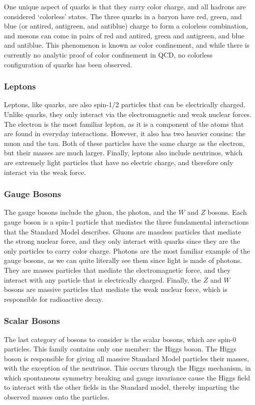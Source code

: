 One unique aspect of quarks is that they carry color charge, and all hadrons are considered `colorless' states.
The three quarks in a baryon have red, green, and blue (or antired, antigreen, and antiblue) charge to form a colorless combination, and mesons can come in pairs of red and antired, green and antigreen, and blue and antiblue.
This phenomenon is known as color confinement, and while there is currently no analytic proof of color confinement in QCD, no colorless configuration of quarks has been observed. %

\subsubsection{Leptons}
Leptons, like quarks, are also spin-1/2 particles that can be electrically charged. Unlike quarks, they only interact via the electromagnetic and weak nuclear forces.
The electron is the most familiar lepton, as it is a component of the atoms that are found in everyday interactions.
However, it also has two heavier cousins: the muon and the tau.
Both of these particles have the same charge as the electron, but their masses are much larger.
Finally, leptons also include neutrinos, which are extremely light particles that have no electric charge, and therefore only interact via the weak force.

\subsubsection{Gauge Bosons}
The gauge bosons include the gluon, the photon, and the $W$ and $Z$ bosons.
Each gauge boson is a spin-1 particle that mediates the three fundamental interactions that the Standard Model describes.
Gluons are massless particles that mediate the strong nuclear force, and they only interact with quarks since they are the only particles to carry color charge.
Photons are the most familiar example of the gauge bosons, as we can quite literally see them since light is made of photons.
They are masses particles that mediate the electromagnetic force, and they interact with any particle that is electrically charged.
Finally, the $Z$ and $W$ bosons are massive particles that mediate the weak nuclear force, which is responsible for radioactive decay.

\subsubsection{Scalar Bosons}
The last category of bosons to consider is the scalar bosons, which are spin-0 particles.
This family contains only one member: the Higgs boson.
The Higgs boson is responsible for giving all massive Standard Model particles their masses, with the exception of the neutrinos.
This occurs through the Higgs mechanism, in which spontaneous symmetry breaking and gauge invariance cause the Higgs field to interact with the other fields in the Standard model, thereby imparting the observed masses onto the particles. %

